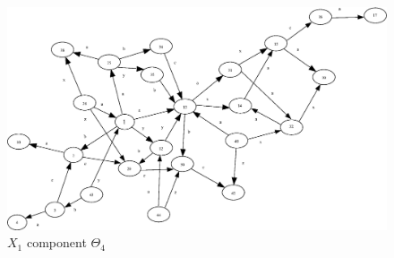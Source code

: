 \documentclass[a4paper,12pt]{article}
\numberwithin{equation}{section}
\numberwithin{figure}{section}
\begin{document}
\begin{figure}
\begin{center}
\includegraphics[scale=0.55, bb=0 0 710 420]{python/ex_K_f4.eps}
\caption{$X_1$ component $\Theta_4$}
\label{fig:K_f4}
\end{center}
\end{figure}
\end{document}
